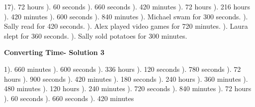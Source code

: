 \documentclass{article}%
\begin{document}
17). 72 hours%
). 60 seconds%
). 660 seconds%
). 420 minutes%
). 72 hours%
). 216 hours%
). 420 minutes%
). 600 seconds%
). 840 minutes%
). Michael swam for 300 seconds.%
). Sally read for 420 seconds.%
). Alex played video games for 720 minutes.%
). Laura slept for 360 seconds.%
). Sally sold potatoes for 300 minutes.%
\newline%
\newpage%
\large%
\begin{center}%
\textbf{Converting Time- Solution 3}%
\newline%
\end{center} \normalsize%
1). 660 minutes%
). 600 seconds%
). 336 hours%
). 120 seconds%
). 780 seconds%
). 72 hours%
). 900 seconds%
). 420 minutes%
). 180 seconds%
). 240 hours%
). 360 minutes%
). 480 minutes%
). 120 hours%
). 240 minutes%
). 720 seconds%
). 840 minutes%
). 72 hours%
). 60 seconds%
). 660 seconds%
). 420 minutes%
\newline%
\end{document}
